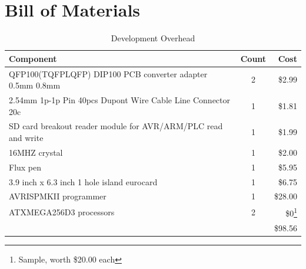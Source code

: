 \documentclass[bibtotocnumbered,abstract=on,paper=a4,fontsize=12pt,parskip=on,halfparskip=on]{scrartcl}		%
\begin{document}
\section{Bill of Materials}
    \begin{table}[H]
    \caption{Development Overhead}
    \vskip 0.3cm
    \begin{tabularx}{\linewidth}{  X c r }
      \textbf{Component} & \textbf{Count} & \textbf{Cost} \\
      \hline
      QFP100(TQFPLQFP) DIP100 PCB converter adapter 0.5mm 0.8mm & 2 & \$2.99 \\
      2.54mm 1p-1p Pin 40pcs Dupont Wire Cable Line Connector 20c & 1 & \$1.81 \\
      SD card breakout reader module for AVR/ARM/PLC read and write & 1 & \$1.99 \\
      16MHZ crystal & 1 & \$2.00 \\
      Flux pen & 1 & \$5.95 \\
      3.9 inch x 6.3 inch 1 hole island eurocard & 1 & \$6.75 \\
      AVRISPMKII programmer & 1 & \$28.00 \\
      ATXMEGA256D3 processors & 2 & \$0\footnote{Sample, worth \$20.00 each} \\
      \hline
       & & \$98.56 \\

    \end{tabularx}
    \end{table}
\end{document}
